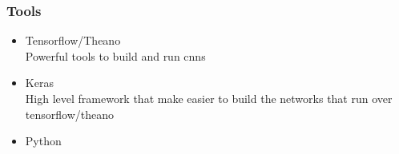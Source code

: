 \documentclass[aspectratio=169]{beamer}
\begin{document}
		\begin{frame}
			\frametitle{Tools}
			\begin{itemize}
				\item Tensorflow/Theano\\
					\textcolor{ExecusharesGrey}{\small\hspace{1em}Powerful tools to build and run cnns}
				\item Keras\\
					\textcolor{ExecusharesGrey}{\small\hspace{1em}High level framework that make easier to build the networks that run over tensorflow/theano}
				\item Python
			\end{itemize}
		\end{frame}
\end{document}
